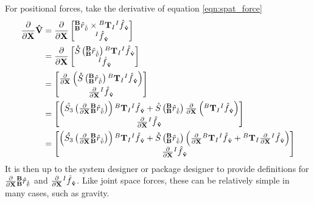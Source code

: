 \noindent For positional forces, take the derivative of equation \ref{eqn:spat_force}
\begin{align} \nonumber
    \frac{\partial}{\partial\mathbf{X}}\mathbf{\hat{V}} &= \frac{\partial}{\partial\mathbf{X}}\begin{bmatrix}                                                    
	{{^\mathbf{B}_\mathbf{B}}}\hat{r}_{\hat{\mathbf{\hat{v}}}} \times {^B\mathbf{T}_I}{^I\hat{f}}_{\mathbf{\hat{v}}} \\ {^I\hat{f}}_{\mathbf{\hat{v}}} 
	\end{bmatrix} \\  \nonumber
	&= \frac{\partial}{\partial\mathbf{X}}\begin{bmatrix}                                                    
	\mathring{S}\left({{^\mathbf{B}_\mathbf{B}}}\hat{r}_{\hat{\mathbf{\hat{v}}}}\right){^B\mathbf{T}_I}{^I\hat{f}}_{\mathbf{\hat{v}}} \\ {^I\hat{f}}_{\mathbf{\hat{v}}} 
	\end{bmatrix}  \\ \nonumber
	&= \begin{bmatrix}                                                    
	\frac{\partial}{\partial\mathbf{X}}\left(\mathring{S}\left({{^\mathbf{B}_\mathbf{B}}}\hat{r}_{\hat{\mathbf{\hat{v}}}}\right){^B\mathbf{T}_I}{^I\hat{f}}_{\mathbf{\hat{v}}} \right) \\ \frac{\partial}{\partial\mathbf{X}} {^I\hat{f}}_{\mathbf{\hat{v}}} 
	\end{bmatrix}  \\ \nonumber
	&= \begin{bmatrix}                                                    
	\left(\mathring{S_3}\left(\frac{\partial}{\partial\mathbf{X}}{{^\mathbf{B}_\mathbf{B}}}\hat{r}_{\hat{\mathbf{\hat{v}}}}\right) \right){^B\mathbf{T}_I}{^I\hat{f}}_{\mathbf{\hat{v}}} + \mathring{S}\left({{^\mathbf{B}_\mathbf{B}}}\hat{r}_{\hat{\mathbf{\hat{v}}}}\right)\frac{\partial}{\partial\mathbf{X}}\left({^B\mathbf{T}_I}{^I\hat{f}}_{\mathbf{\hat{v}}} \right) \\ \frac{\partial}{\partial\mathbf{X}} {^I\hat{f}}_{\mathbf{\hat{v}}} 
	\end{bmatrix}  \\ 
	&= \begin{bmatrix}                                                    
	\left(\mathring{S_3}\left(\frac{\partial}{\partial\mathbf{X}}{{^\mathbf{B}_\mathbf{B}}}\hat{r}_{\hat{\mathbf{\hat{v}}}}\right) \right){^B\mathbf{T}_I}{^I\hat{f}}_{\mathbf{\hat{v}}} + \mathring{S}\left({{^\mathbf{B}_\mathbf{B}}}\hat{r}_{\hat{\mathbf{\hat{v}}}}\right)
	\left(\frac{\partial}{\partial\mathbf{X}}{^B\mathbf{T}_I}{^I\hat{f}}_{\mathbf{\hat{v}}} + {^B\mathbf{T}_I}\frac{\partial}{\partial\mathbf{X}}{^I\hat{f}}_{\mathbf{\hat{v}}} \right) \\
	\frac{\partial}{\partial\mathbf{X}} {^I\hat{f}}_{\mathbf{\hat{v}}} 
	\end{bmatrix} 
\end{align}
\noindent It is then up to the system designer or package designer to provide definitions for $\frac{\partial}{\partial\mathbf{X}}{{^\mathbf{B}_\mathbf{B}}}\hat{r}_{\hat{\mathbf{\hat{v}}}}$ and $\frac{\partial}{\partial\mathbf{X}} {^I\hat{f}}_{\mathbf{\hat{v}}} $. Like joint space forces, these can be relatively simple in many cases, such as gravity.
